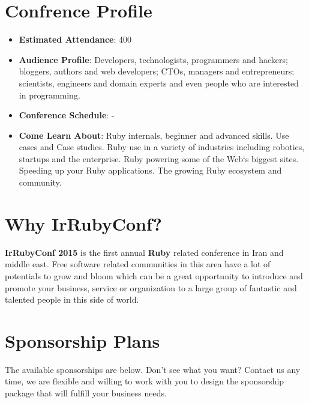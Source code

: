 \documentclass[a4paper,12pt]{article}
\begin{document}
\section*{Confrence Profile}
\begin{itemize}
\item{\textbf{Estimated Attendance}: 400}
\item{\textbf{Audience Profile}: Developers, technologists, programmers and hackers; bloggers, authors and web developers; CTOs, managers and entrepreneurs; scientists, engineers and domain experts and even people who are interested in programming.
}
\item{\textbf{Conference Schedule}: -}
\item{\textbf{Come Learn About}: Ruby internals, beginner and advanced skills. Use cases and Case studies. Ruby use in a variety of industries including robotics, startups and the enterprise. Ruby powering some of the Web`s biggest sites. Speeding up your Ruby applications. The growing Ruby ecosystem and community.
}
\end{itemize}

\section*{Why IrRubyConf?}
\textbf{IrRubyConf 2015} is the first annual \textbf{Ruby} related conference in Iran and middle east. Free software related communities in this area have a lot of potentials to grow and bloom which can be a great opportunity to introduce and promote your business, service or organization to a large group of fantastic and talented people in this side of world.
\section*{Sponsorship Plans}
The available sponsorships are below. Don't see what you want? Contact us any time, we are flexible and willing to work with you to design the sponsorship package that will fulfill your business needs.
\end{document}
